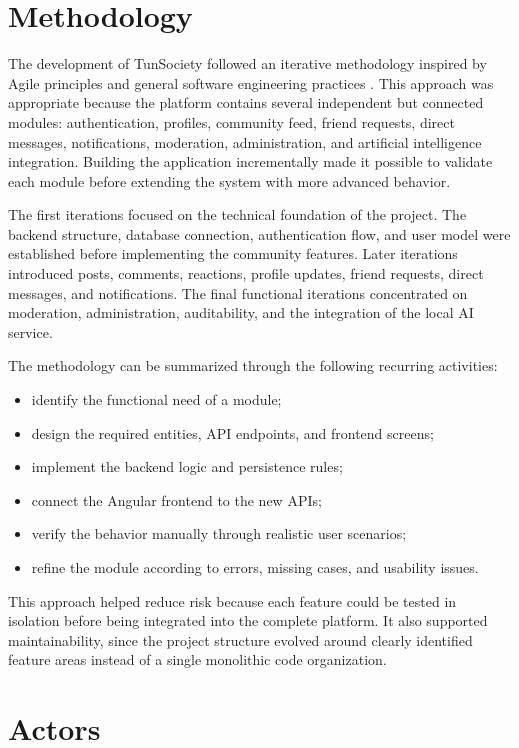 \section{Methodology}

The development of TunSociety followed an iterative methodology inspired by Agile principles and general software engineering practices \cite{sommerville}. This approach was appropriate because the platform contains several independent but connected modules: authentication, profiles, community feed, friend requests, direct messages, notifications, moderation, administration, and artificial intelligence integration. Building the application incrementally made it possible to validate each module before extending the system with more advanced behavior.

The first iterations focused on the technical foundation of the project. The backend structure, database connection, authentication flow, and user model were established before implementing the community features. Later iterations introduced posts, comments, reactions, profile updates, friend requests, direct messages, and notifications. The final functional iterations concentrated on moderation, administration, auditability, and the integration of the local AI service.

The methodology can be summarized through the following recurring activities:

\begin{itemize}
    \item identify the functional need of a module;
    \item design the required entities, API endpoints, and frontend screens;
    \item implement the backend logic and persistence rules;
    \item connect the Angular frontend to the new APIs;
    \item verify the behavior manually through realistic user scenarios;
    \item refine the module according to errors, missing cases, and usability issues.
\end{itemize}

This approach helped reduce risk because each feature could be tested in isolation before being integrated into the complete platform. It also supported maintainability, since the project structure evolved around clearly identified feature areas instead of a single monolithic code organization.

\section{Actors}


